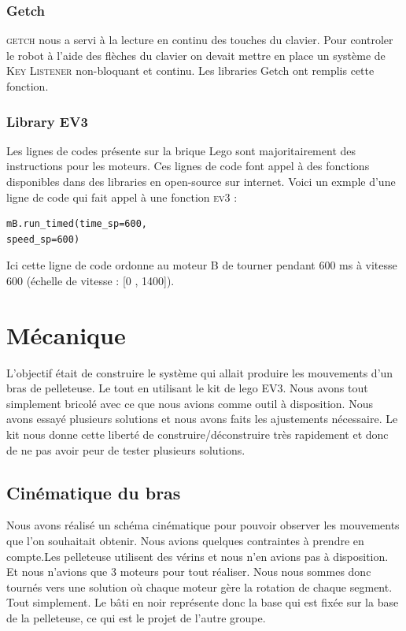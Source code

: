 \documentclass[twoside,twocolumn, 16pt]{article}
\begin{document}
\subsubsection{Getch}
\textsc{getch} nous a servi à la lecture en continu des touches du clavier. Pour controler le robot à l'aide des flèches du clavier on devait mettre en place un système de \textsc{Key Listener} non-bloquant et continu. Les libraries Getch ont remplis cette fonction.

\subsubsection{Library EV3}
Les lignes de codes présente sur la brique Lego sont majoritairement des instructions pour les moteurs. Ces lignes de code font appel à des fonctions disponibles dans des libraries en open-source sur internet. Voici un exmple d'une ligne de code qui fait appel à une fonction \textsc{ev3} : \\
\vspace{-0.5cm}
\begin{lstlisting}
mB.run_timed(time_sp=600, 
speed_sp=600)
\end{lstlisting}
Ici cette ligne de code ordonne au moteur B de tourner pendant 600 ms à vitesse 600 (échelle de vitesse : [0 , 1400]).


\section{Mécanique}

L’objectif était de construire le système qui allait produire les mouvements d’un bras de pelleteuse. Le tout en utilisant le kit de lego EV3. Nous avons tout simplement bricolé avec ce que nous avions comme outil à disposition. Nous avons essayé plusieurs solutions et nous avons faits les ajustements nécessaire. Le kit nous donne cette liberté de construire/déconstruire très rapidement et donc de ne pas avoir peur de tester plusieurs solutions. 

\subsection{Cinématique du bras}

Nous avons réalisé un schéma cinématique pour pouvoir observer les mouvements que l’on souhaitait obtenir. Nous avions quelques contraintes à prendre en compte.Les pelleteuse utilisent des vérins et nous n’en avions pas à disposition.
Et nous n’avions que 3 moteurs pour tout réaliser.
Nous nous sommes donc tournés vers une solution où chaque moteur gère la rotation de chaque segment. Tout simplement.
Le bâti en noir représente donc la base qui est fixée sur la base de la pelleteuse, ce qui est le projet de l'autre groupe.
\end{document}
